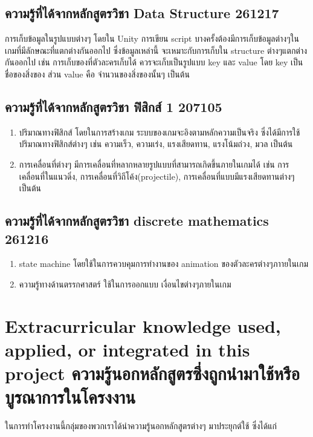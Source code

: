 \subsection{ความรู้ที่ได้จากหลักสูตรวิชา Data Structure 261217}
\enskip \enskip \enskip การเก็บข้อมูลในรูปแบบต่างๆ โดยใน Unity การเขียน script บางครั้งต้องมีการเก็บข้อมูลต่างๆในเกมที่มีลักษณะที่แตกต่างกันออกไป ซึ่งข้อมูลเหล่านี้
จะเหมาะกับการเก็บใน structure ต่างๆแตกต่างกันออกไป เช่น การเก็บของที่ตัวละครเก็บได้ ควรจะเก็บเป็นรูปแบบ key และ value โดย key เป็น ชื่อของสิ่งของ
ส่วน value คือ จำนวนของสิ่งของนั้นๆ เป็นต้น

\subsection{ความรู้ที่ได้จากหลักสูตรวิชา ฟิสิกส์ 1 207105}
\begin{enumerate}
\item ปริมาณทางฟิสิกส์ โดยในการสร้างเกม ระบบของเกมจะอิงตามหลักความเป็นจริง ซึ่งได้มีการใช้ปริมาณทางฟิสิกส์ต่างๆ เช่น ความเร็ว, ความเร่ง, 
แรงเสียดทาน, แรงโน้มถ่วง, มวล เป็นต้น
\item การเคลื่อนที่ต่างๆ มีการเคลื่อนที่หลากหลายรูปแบบที่สามารถเกิดขึ้นภายในเกมได้ เช่น การเคลื่อนที่ในแนวดิ่ง, การเคลื่อนที่วิถีโค้ง(projectile), การเคลื่อนที่แบบมีแรงเสียดทานต่างๆ เป็นต้น
\end{enumerate}

\subsection{ความรู้ที่ได้จากหลักสูตรวิชา discrete mathematics 261216}
\begin{enumerate}
\item state machine โดยใช้ในการควบคุมการทำงานของ animation ของตัวละครต่างๆภาายในเกม
\item ความรู้ทางด้านตรรกศาสตร์ ใช้ในการออกแบบ เงื่อนไขต่างๆภายในเกม
\end{enumerate}




\section{\ifenglish%
Extracurricular knowledge used, applied, or integrated in this project
\else%
ความรู้นอกหลักสูตรซึ่งถูกนำมาใช้หรือบูรณาการในโครงงาน
\fi
}
\enskip \enskip \enskip \enskip \enskip ในการทำโครงงานนี้กลุ่มของพวกเราได้นำความรู้นอกหลักสูตรต่างๆ มาประยุกต์ใช้ ซึ่งได้แก่

